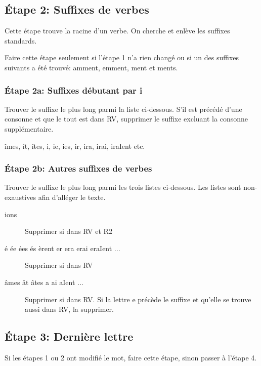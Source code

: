 \subsection*{Étape 2: Suffixes de verbes}

Cette étape trouve la racine d'un verbe. On cherche et enlève les suffixes standards.

Faire cette étape seulement si l'étape 1 n'a rien changé ou si un des suffixes suivants a été trouvé: amment, emment, ment et ments.

\subsubsection*{Étape 2a: Suffixes débutant par i}

Trouver le suffixe le plus long parmi la liste ci-dessous. S'il est précédé d'une consonne et que le tout est dans RV, supprimer le suffixe excluant la consonne supplémentaire.

îmes, ît, îtes, i, ie, ies, ir, ira, irai, iraIent etc.

\subsubsection*{Étape 2b: Autres suffixes de verbes}

Trouver le suffixe le plus long parmi les trois listes ci-dessous. Les listes sont non-exaustives afin d'alléger le texte.

\begin{description}
  \item[ions]
  
  Supprimer si dans RV et R2
  
  \item[é ée ées és èrent er era erai eraIent ...]
  
  Supprimer si dans RV
  
  \item[âmes ât âtes a ai aIent ...]
  
  Supprimer si dans RV. Si la lettre e précède le suffixe et qu'elle se trouve aussi dans RV, la supprimer.
\end{description}

\subsection*{Étape 3: Dernière lettre}

Si les étapes 1 ou 2 ont modifié le mot, faire cette étape, sinon passer à l'étape 4.

